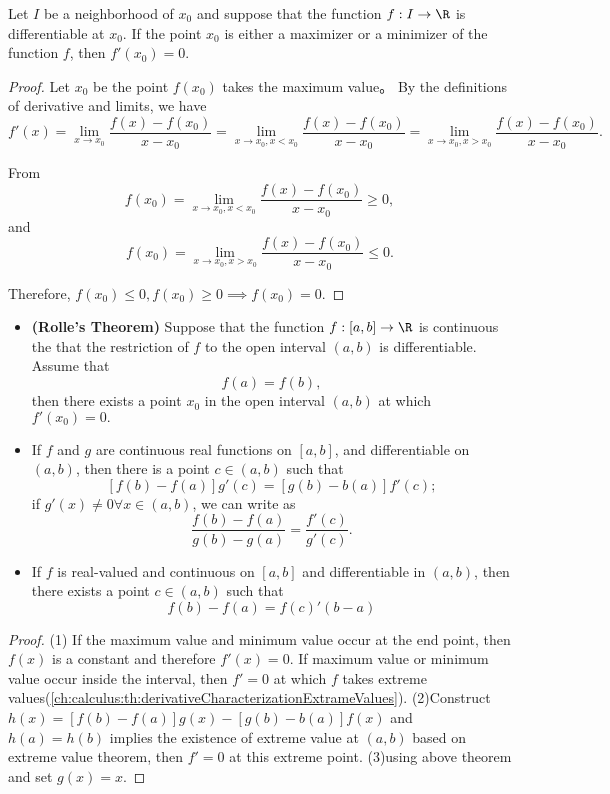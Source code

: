 \begin{refsection}
\begin{lemma}\cite[103]{fitzpatrick2006advanced}\label{ch:calculus:th:derivativeCharacterizationExtrameValues}
Let $I$ be a neighborhood of $x_0$ and suppose that the function $f:I\to \R$ is differentiable at $x_0$. If the point $x_0$ is either a maximizer or a minimizer of the function $f$, then $f'(x_0) = 0$.	
\end{lemma}
\begin{proof}
Let $x_0$ be the point $f(x_0)$ takes the maximum value。	
By the definitions of derivative and limits, we have
$$f'(x) = \lim_{x\to x_0} \frac{f(x)-f(x_0)}{x-x_0} = \lim_{x\to x_0, x<x_0} \frac{f(x)-f(x_0)}{x-x_0} = \lim_{x\to x_0,x>x_0} \frac{f(x)-f(x_0)}{x-x_0}.$$

From 
$$f(x_0) = \lim_{x\to x_0, x<x_0} \frac{f(x)-f(x_0)}{x-x_0} \geq 0,$$
and
$$f(x_0) = \lim_{x\to x_0, x>x_0} \frac{f(x)-f(x_0)}{x-x_0} \leq 0.$$

Therefore, $f(x_0)\leq 0, f(x_0)\geq 0 \implies f(x_0) = 0.$


\end{proof}

\begin{theorem}\cite{johnsonbaugh2010foundations}\cite[103]{fitzpatrick2006advanced}\label{ch:calculus:th:meanValueTheorem}\hfill
\begin{itemize}
	\item \textbf{(Rolle's Theorem)} Suppose that the function $f:[a,b]\to \R$ is continuous the that the restriction of $f$ to the open interval $(a,b)$ is differentiable. Assume that 
	$$f(a) = f(b),$$
	then there exists a point $x_0$ in the open interval $(a,b)$ at which $f'(x_0) = 0.$
	\item If $f$ and $g$ are continuous real functions on $[a,b]$, and differentiable on $(a,b)$, then there is a point $c\in(a,b)$ such that 
	$$[f(b)-f(a)]g'(c) = [g(b)-b(a)]f'(c);$$
	if $g'(x)\neq 0 \forall x\in (a,b)$, we can write as
	$$\frac{f(b)-f(a)}{g(b)-g(a)} = \frac{f'(c)}{g'(c)}.$$
	
	
	\item If $f$ is real-valued and continuous on $[a,b]$ and differentiable in $(a,b)$, then there exists a point $c\in (a,b)$ such that
	$$f(b)-f(a) = f(c)'(b-a)$$
\end{itemize}	
\end{theorem}
\begin{proof}
(1) If the maximum value and minimum value occur at the end point, then $f(x)$ is a constant and therefore $f'(x) = 0$. If maximum value or minimum value occur inside the interval, then $f'=0$ at which $f$ takes extreme values(\autoref{ch:calculus:th:derivativeCharacterizationExtrameValues}).	
(2)Construct $h(x) = [f(b)-f(a)]g(x) - [g(b)-b(a)]f(x)$ and $h(a)=h(b)$ implies the existence of extreme value at $(a,b)$ based on extreme value theorem, then $f' = 0$ at this extreme point.	
(3)using above theorem and set $g(x) = x$.	
\end{proof}



\end{refsection}

